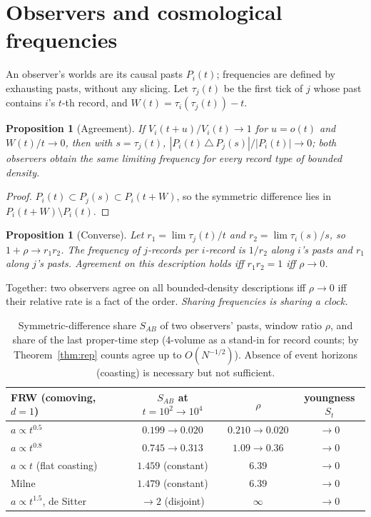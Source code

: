 \documentclass[11pt]{article}
\newtheorem{proposition}[theorem]{Proposition}
\theoremstyle{definition}
\theoremstyle{remark}
\begin{document}
\section{Observers and cosmological frequencies}\label{sec:freq}

An observer's worlds are its causal pasts $P_i(t)$; frequencies are defined by exhausting pasts, without any slicing. Let $\tau_j(t)$ be the first tick of $j$ whose past contains $i$'s $t$-th record, and $W(t)=\tau_i(\tau_j(t))-t$.

\begin{proposition}[Agreement]\label{prop:m1}
If $V_i(t+u)/V_i(t)\to1$ for $u=o(t)$ and $W(t)/t\to0$, then with $s=\tau_j(t)$, $|P_i(t)\,\triangle\,P_j(s)|/|P_i(t)|\to0$; both observers obtain the same limiting frequency for every record type of bounded density.
\end{proposition}
\begin{proof}
$P_i(t)\subset P_j(s)\subset P_i(t+W)$, so the symmetric difference lies in $P_i(t+W)\setminus P_i(t)$.
\end{proof}

\begin{proposition}[Converse]\label{prop:m2}
Let $r_1=\lim\tau_j(t)/t$ and $r_2=\lim\tau_i(s)/s$, so $1+\rho\to r_1r_2$. The frequency of $j$-records per $i$-record is $1/r_2$ along $i$'s pasts and $r_1$ along $j$'s pasts. Agreement on this description holds iff $r_1r_2=1$ iff $\rho\to0$.
\end{proposition}

Together: two observers agree on all bounded-density descriptions iff $\rho\to0$ iff their relative rate is a fact of the order. \emph{Sharing frequencies is sharing a clock.}

\begin{table}[h]\centering\small
\begin{tabular}{lccc}\toprule
FRW (comoving, $d=1$) & $S_{AB}$ at $t=10^2\to10^4$ & $\rho$ & youngness $S_t$\\\midrule
$a\propto t^{0.5}$ & $0.199\to0.020$ & $0.210\to0.020$ & $\to0$\\
$a\propto t^{0.8}$ & $0.745\to0.313$ & $1.09\to0.36$ & $\to0$\\
$a\propto t$ (flat coasting) & $1.459$ (constant) & $6.39$ & $\to0$\\
Milne & $1.479$ (constant) & $6.39$ & $\to0$\\
$a\propto t^{1.5}$, de Sitter & $\to2$ (disjoint) & $\infty$ & $\to0$\\\bottomrule
\end{tabular}
\caption{Symmetric-difference share $S_{AB}$ of two observers' pasts, window ratio $\rho$, and share of the last proper-time step (4-volume as a stand-in for record counts; by Theorem~\ref{thm:rep} counts agree up to $O(N^{-1/2})$). Absence of event horizons (coasting) is necessary but not sufficient.}
\end{table}
\end{document}
